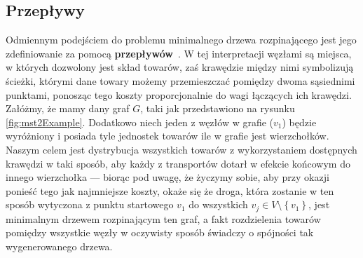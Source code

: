 \subsection{Przepływy}

Odmiennym podejściem do problemu minimalnego drzewa rozpinającego jest jego zdefiniowanie za pomocą \textbf{przepływów}~\cite[$38$--$44$]{Magnanti1995503}. W tej interpretacji węzłami są miejsca, w których dozwolony jest skład towarów, zaś krawędzie między nimi symbolizują ścieżki, którymi dane towary możemy przemieszczać pomiędzy dwoma sąsiednimi punktami, ponosząc tego koszty proporcjonalnie do wagi łączących ich krawędzi. Załóżmy, że mamy dany graf $G$, taki jak przedstawiono na rysunku \ref{fig:mst2Example}. Dodatkowo niech jeden z węzłów w grafie ($v_{1}$) będzie wyróżniony i posiada tyle jednostek towarów ile w grafie jest wierzchołków. Naszym celem jest dystrybucja wszystkich towarów z wykorzystaniem dostępnych krawędzi w taki sposób, aby każdy z transportów dotarł w efekcie końcowym do innego wierzchołka --- biorąc pod uwagę, że życzymy sobie, aby przy okazji ponieść tego jak najmniejsze koszty, okaże się że droga, która zostanie w ten sposób wytyczona z punktu startowego $v_{1}$ do wszystkich $ v_{j} \in V \setminus \left\{ v_{1} \right\}$, jest minimalnym drzewem rozpinającym ten graf, a fakt rozdzielenia towarów pomiędzy wszystkie węzły w oczywisty sposób świadczy o spójności tak wygenerowanego drzewa.

